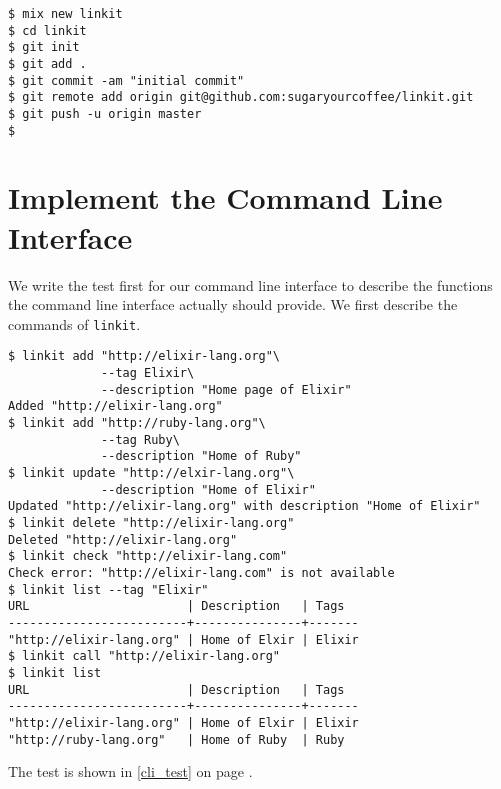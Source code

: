 \documentclass[10pt, a4paper]{article}
\begin{document}
\begin{verbatim}
$ mix new linkit
$ cd linkit
$ git init
$ git add .
$ git commit -am "initial commit"
$ git remote add origin git@github.com:sugaryourcoffee/linkit.git
$ git push -u origin master
$
\end{verbatim}

\section{Implement the Command Line Interface}
We write the test first for our command line interface to describe the
functions the command line interface actually should provide. We first 
describe the commands of \texttt{linkit}.

\begin{verbatim}
$ linkit add "http://elixir-lang.org"\
             --tag Elixir\
             --description "Home page of Elixir"
Added "http://elixir-lang.org"
$ linkit add "http://ruby-lang.org"\
             --tag Ruby\
             --description "Home of Ruby"
$ linkit update "http://elxir-lang.org"\
             --description "Home of Elixir"
Updated "http://elixir-lang.org" with description "Home of Elixir"
$ linkit delete "http://elixir-lang.org"
Deleted "http://elixir-lang.org"
$ linkit check "http://elixir-lang.com"
Check error: "http://elixir-lang.com" is not available
$ linkit list --tag "Elixir"
URL                      | Description   | Tags
-------------------------+---------------+-------
"http://elixir-lang.org" | Home of Elxir | Elixir
$ linkit call "http://elixir-lang.org"
$ linkit list
URL                      | Description   | Tags
-------------------------+---------------+-------
"http://elixir-lang.org" | Home of Elxir | Elixir
"http://ruby-lang.org"   | Home of Ruby  | Ruby   
\end{verbatim}

The test is shown in \ref{cli_test} on page \pageref{cli_test}.
\end{document}
